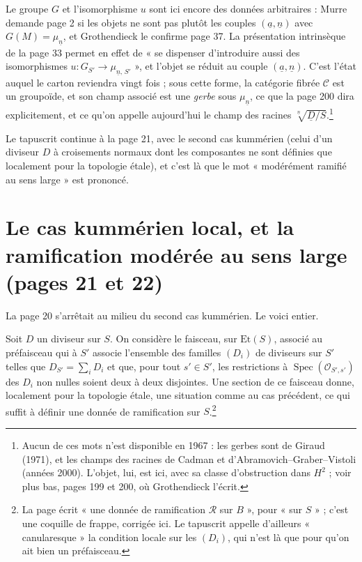 \documentclass[11pt,a4paper]{article}
\begin{document}
Le groupe $G$ et l'isomorphisme $u$ sont ici encore des données arbitraires :
Murre demande page 2 si les objets ne sont pas plutôt les couples
$(\underline{a}, \underline{n})$ avec $G(M) = \mu_{\underline{n}}$, et
Grothendieck le confirme page 37. La présentation intrinsèque de la page 33
permet en effet de « se dispenser d'introduire aussi des isomorphismes
$u : G_{S'} \to \mu_{\underline{n},\,S'}$ », et l'objet se réduit au couple
$(\underline{a}, \underline{n})$. C'est l'état auquel le carton reviendra vingt
fois ; sous cette forme, la catégorie fibrée $\mathcal{C}$ est un groupoïde,
et son champ associé est une \emph{gerbe} sous $\mu_{\underline{n}}$, ce que
la page 200 dira explicitement, et ce qu'on appelle aujourd'hui le champ des
racines $\sqrt[\underline{n}]{\underline{D}/S}$.\footnote{Aucun de ces mots
n'est disponible en 1967 : les gerbes sont de Giraud (1971), et les champs des
racines de Cadman et d'Abramovich--Graber--Vistoli (années 2000). L'objet, lui,
est ici, avec sa classe d'obstruction dans $H^{2}$ ; voir plus bas, pages 199
et 200, où Grothendieck l'écrit.}

Le tapuscrit continue à la page 21, avec le second cas kummérien
(celui d'un diviseur $D$ à croisements normaux dont les composantes ne sont
définies que localement pour la topologie étale), et c'est là que le mot
« modérément ramifié au sens large » est prononcé.

\section*{Le cas kummérien local, et la ramification modérée au sens large (pages 21 et 22)}

La page 20 s'arrêtait au milieu du second cas kummérien. Le voici entier.

Soit $D$ un diviseur sur $S$. On considère le faisceau, sur $\mathrm{Et}(S)$,
associé au préfaisceau qui à $S'$ associe l'ensemble des familles $(D_{i})$ de
diviseurs sur $S'$ telles que $D_{S'} = \sum_{i} D_{i}$ et que, pour tout
$s' \in S'$, les restrictions à $\operatorname{Spec}(\mathcal{O}_{S',s'})$ des
$D_{i}$ non nulles soient deux à deux disjointes. Une section de ce faisceau
donne, localement pour la topologie étale, une situation comme au cas
précédent, ce qui suffit à définir une donnée de ramification sur
$S$.\footnote{La page écrit « une donnée de ramification $\mathcal{R}$ sur
$B$ », pour « sur $S$ » ; c'est une coquille de frappe, corrigée ici. Le
tapuscrit appelle d'ailleurs « canularesque » la condition locale sur les
$(D_{i})$, qui n'est là que pour qu'on ait bien un préfaisceau.}
\end{document}
